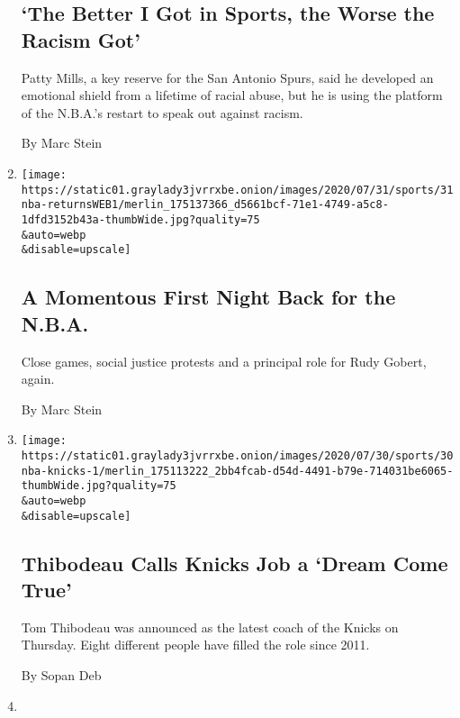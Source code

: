 \begin{enumerate}
{  \subsection{`The Better I Got in Sports, the Worse the Racism
  Got'}\label{the-better-i-got-in-sports-the-worse-the-racism-got}}

  Patty Mills, a key reserve for the San Antonio Spurs, said he
  developed an emotional shield from a lifetime of racial abuse, but he
  is using the platform of the N.B.A.'s restart to speak out against
  racism.

  By Marc Stein
\item
  \href{/2020/07/31/sports/basketball/nba-opening-night.html}{}

  \texttt{[image: https://static01.graylady3jvrrxbe.onion/images/2020/07/31/sports/31nba-returnsWEB1/merlin\_175137366\_d5661bcf-71e1-4749-a5c8-1dfd3152b43a-thumbWide.jpg?quality=75\\\&auto=webp\\\&disable=upscale]}

  \hypertarget{a-momentous-first-night-back-for-the-nba}{%
  \subsection{A Momentous First Night Back for the
  N.B.A.}\label{a-momentous-first-night-back-for-the-nba}}

  Close games, social justice protests and a principal role for Rudy
  Gobert, again.

  By Marc Stein
\item
  \href{/2020/07/30/sports/basketball/nba-knicks-coach-tom-thibodeau.html}{}

  \texttt{[image: https://static01.graylady3jvrrxbe.onion/images/2020/07/30/sports/30nba-knicks-1/merlin\_175113222\_2bb4fcab-d54d-4491-b79e-714031be6065-thumbWide.jpg?quality=75\\\&auto=webp\\\&disable=upscale]}

  \hypertarget{thibodeau-calls-knicks-job-a-dream-come-true}{%
  \subsection{Thibodeau Calls Knicks Job a `Dream Come
  True'}\label{thibodeau-calls-knicks-job-a-dream-come-true}}

  Tom Thibodeau was announced as the latest coach of the Knicks on
  Thursday. Eight different people have filled the role since 2011.

  By Sopan Deb
\item
  \href{/2020/07/30/sports/basketball/clippers-lakers.html}{}


\end{enumerate}
